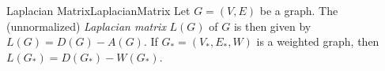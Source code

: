 \begin{mdef}{Laplacian Matrix}{LaplacianMatrix}
    Let $G=(V,E)$ be a graph. The (unnormalized) \emph{Laplacian matrix} $L(G)$ of $G$ is then given by $L(G) = D(G) - A(G)$. If $G_* = (V_*,E_*,W)$ is a weighted graph, then $L(G_*) = D(G_*) - W(G_*)$.
\end{mdef}